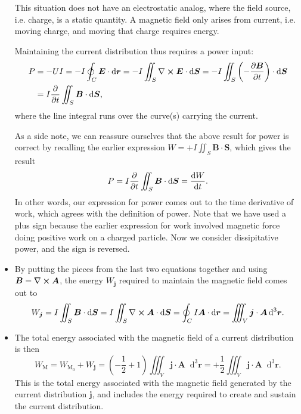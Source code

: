 \documentclass[11pt, a4paper]{article}
\newcommand{\diff}{\mathop{}\!\mathrm{d}} %
\newcommand{\dr}{\diff^{3} \r}  %
\renewcommand{\vec}[1]{\bm{#1}} %
\renewcommand{\r}{\vec{r}}
\newcommand{\E}{\vec{E}} %
\newcommand{\B}{\vec{B}} %
\newcommand{\A}{\vec{A}} %
\renewcommand{\j}{\vec{j}}  %
\renewcommand{\curl}{\nabla \cross}
\begin{document}
\begin{itemize}
    This situation does not have an electrostatic analog, where the field source, i.e. charge, is a static quantity. A magnetic field only arises from current, i.e. moving charge, and moving that charge requires energy.
    
    Maintaining the current distribution thus requires a power input:
    \begin{align*}
        P &= - UI = -I \oint_{C} \E \cdot \diff \r = - I \iint_{S} \curl \E \cdot \diff \vec{S} = - I \iint_{S} \left( - \pdv{\B}{t} \right) \cdot \diff \vec{S}\\
        &= I \pdv{t} \iint_{S} \B \cdot \diff \vec{S},
    \end{align*}
    where the line integral runs over the curve(s) carrying the current. 

    As a side note, we can reassure ourselves that the above result for power is correct by recalling the earlier expression $ W = + I \iint_{S} \B \cdot \vec{S} $, which gives the result
    \begin{equation*}
        P = I \pdv{t} \iint_{S} \B \cdot \diff \vec{S} = \dv{W}{t}.
    \end{equation*}
    In other words, our expression for power comes out to the time derivative of work, which agrees with the definition of power. Note that we have used a plus sign because the earlier expression for work involved magnetic force doing positive work on a charged particle. Now we consider dissipitative power, and the sign is reversed.

    \item By putting the pieces from the last two equations together and using $ \B = \curl \A $, the energy $ W_{\j} $ required to maintain the magnetic field comes out to
    \begin{equation*}
        W_{\j} = I \iint_{S} \B \cdot \diff \vec{S} = I \iint_{S} \curl \A \cdot \diff \vec{S} = \oint_{C} I \A \cdot \diff \r = \iiint_{V} \j \cdot \A \dr.
    \end{equation*}
    
    \item The total energy associated with the magnetic field of a current distribution is then
    \begin{equation*}
        W_{\text{M}} = W_{\text{M}_{0}} + W_{\vec{j}} = \left( -\frac{1}{2} + 1 \right) \iiint_{V} \j \cdot \A \dr = + \frac{1}{2} \iiint_{V} \j \cdot \A \dr.
    \end{equation*}
    This is the total energy associated with the magnetic field generated by the current distribution $ \j $, and includes the energy required to create and sustain the current distribution.
    
\end{itemize}
\end{document}
